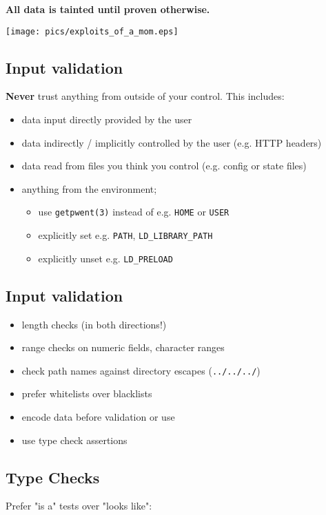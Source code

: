 \documentclass[xga]{xdvislides}
\begin{document}
{\bf All data is tainted until proven otherwise.} \\

\begin{center}
        \texttt{[image: pics/exploits\_of\_a\_mom.eps]}
\end{center}

\subsection{Input validation}

{\bf Never} trust anything from outside of your
control.  This includes:
\begin{itemize}
	\item data input directly provided by the user
	\item data indirectly / implicitly controlled
		by the user (e.g. HTTP headers)
	\item data read from files you think you
		control (e.g. config or state files)
	\item anything from the environment;
		\begin{itemize}
			\item use \verb+getpwent(3)+ instead of e.g. \verb+HOME+ or \verb+USER+
			\item explicitly set e.g. \verb+PATH+, \verb+LD_LIBRARY_PATH+
			\item explicitly unset e.g. \verb+LD_PRELOAD+
		\end{itemize}
\end{itemize}

\subsection{Input validation}
\begin{itemize}
	\item length checks (in both directions!)
	\item range checks on numeric fields, character ranges
	\item check path names against directory escapes (\verb+../../../+)
	\item prefer whitelists over blacklists
	\item encode data before validation or use
	\item use type check assertions
\end{itemize}

\subsection{Type Checks}
Prefer "is a" tests over "looks like": \\
\end{document}
